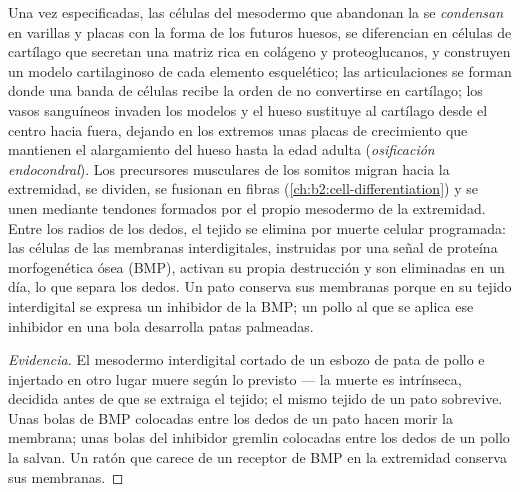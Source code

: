 \begin{proposition}\label{prop:b2:limb-organogenesis:skeleton}
Una vez especificadas, las células del mesodermo que abandonan la  se \emph{condensan} en varillas y placas con la forma de los
futuros huesos, se diferencian en células de cartílago que secretan una
matriz rica en colágeno y proteoglucanos, y construyen un modelo
cartilaginoso de cada elemento esquelético; las articulaciones se forman
donde una banda de células recibe la orden de no convertirse en
cartílago; los vasos sanguíneos invaden los modelos y el hueso sustituye
al cartílago desde el centro hacia fuera, dejando en los extremos unas
placas de crecimiento que mantienen el alargamiento del hueso hasta la
edad adulta (\emph{osificación endocondral}). Los precursores musculares
de los somitos migran hacia la extremidad, se dividen, se fusionan en
fibras
(\cref{ch:b2:cell-differentiation}) y se unen mediante tendones formados
por el propio mesodermo de la extremidad. Entre los radios de los dedos,
el tejido se elimina por muerte celular programada: las células de las
membranas interdigitales, instruidas por una señal de proteína
morfogenética ósea (BMP), activan su propia destrucción y son eliminadas
en un día, lo que separa los dedos. Un pato conserva sus membranas porque
en su tejido interdigital se expresa un inhibidor de la BMP; un pollo al
que se aplica ese inhibidor en una bola desarrolla patas palmeadas.
\end{proposition}
\begin{proof}[Evidencia]
El mesodermo interdigital cortado de un esbozo de pata de pollo e
injertado en otro lugar muere según lo previsto --- la muerte es
intrínseca, decidida antes de que se extraiga el tejido; el mismo tejido
de un pato sobrevive. Unas bolas de BMP colocadas entre los dedos de un
pato hacen morir la membrana; unas bolas del inhibidor gremlin colocadas
entre los dedos de un pollo la salvan. Un ratón que carece de un receptor
de BMP en la extremidad conserva sus membranas.
\end{proof}


